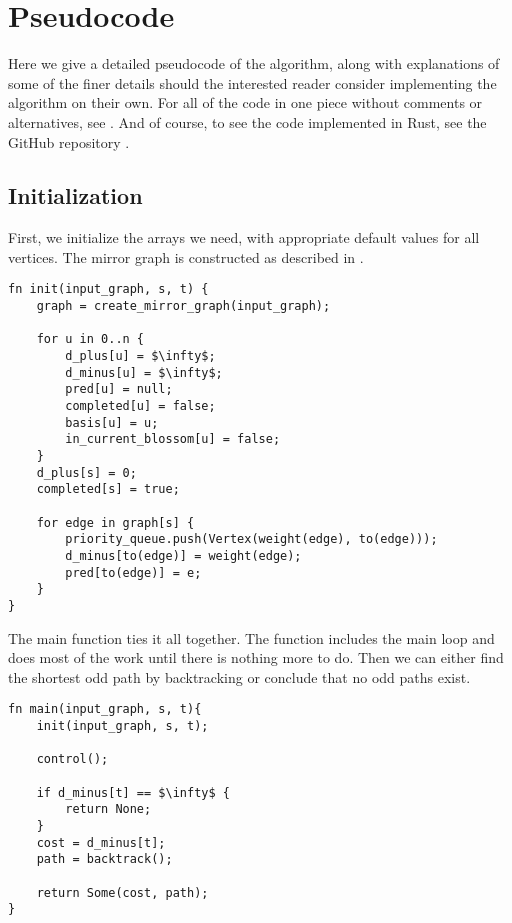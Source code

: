 \section{Pseudocode}
\label{section:odd-path-pseudocode}
Here we give a detailed pseudocode of the algorithm, along with explanations of some of the finer details should the interested reader consider implementing the algorithm on their own. For all of the code in one piece without comments or alternatives, see . And of course, to see the code implemented in Rust, see the GitHub repository \cite{source:codebase}.

\subsection{Initialization}
First, we initialize the arrays we need, with appropriate default values for all vertices. The mirror graph is constructed as described in .
\begin{lstlisting}[caption={Initialization},label=Listing,mathescape=true]
fn init(input_graph, s, t) {
    graph = create_mirror_graph(input_graph);

    for u in 0..n {
        d_plus[u] = $\infty$;
        d_minus[u] = $\infty$;
        pred[u] = null;
        completed[u] = false;
        basis[u] = u;
        in_current_blossom[u] = false;
    }
    d_plus[s] = 0;
    completed[s] = true;

    for edge in graph[s] {
        priority_queue.push(Vertex(weight(edge), to(edge)));
        d_minus[to(edge)] = weight(edge);
        pred[to(edge)] = e;
    }
}
\end{lstlisting}

The main function ties it all together. The  function includes the main loop and does most of the work until there is nothing more to do. Then we can either find the shortest odd path by backtracking or conclude that no odd paths exist.
\begin{lstlisting}[caption={Main},label=Listing,mathescape=true]
fn main(input_graph, s, t){
    init(input_graph, s, t);

    control();

    if d_minus[t] == $\infty$ {
        return None;
    }
    cost = d_minus[t];
    path = backtrack();
    
    return Some(cost, path);
}
\end{lstlisting}

